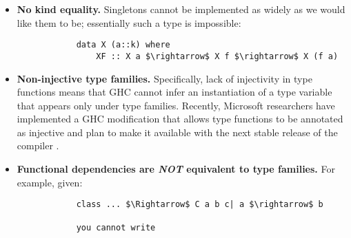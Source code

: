 \begin{itemize}
    \item \textbf{No kind equality.} Singletons cannot be implemented as widely 
    as we would like them to be; essentially such a type is impossible:
        \begin{lstlisting}
            data X (a::k) where
                XF :: X a $\rightarrow$ X f $\rightarrow$ X (f a)
        \end{lstlisting}
    \item \textbf{Non-injective type families.} Specifically, lack of 
    injectivity in type functions means that GHC cannot infer an instantiation 
    of a type variable that appears only under type families. Recently, 
    Microsoft researchers have implemented a GHC modification that allows type 
    functions to be annotated as injective and plan to make it available with 
    the next stable release of the compiler \cite{microsoft}.
    \item \textbf{Functional dependencies are \textit{NOT} equivalent to type 
    families.} For example, given:
        \begin{lstlisting}
            class ... $\Rightarrow$ C a b c| a $\rightarrow$ b
            
            you cannot write
            

\end{lstlisting}
\end{itemize}
